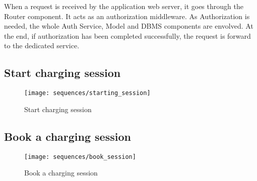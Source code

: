 When a request is received by the application web server, it goes through the Router component. It acts as an authorization middleware. 
As Authorization is needed, the whole Auth Service, Model and DBMS components are envolved.
At the end, if authorization has been completed successfully, the request is forward to the dedicated service.
	
	
\subsection{Start charging session}
\begin{figure}[h]
\texttt{[image: sequences/starting\_session]}
\caption{Start charging session}
\end{figure}
\clearpage
	
\subsection{Book a charging session}
\begin{figure}[h]
\texttt{[image: sequences/book\_session]}
\caption{Book a charging session}
\end{figure}
\clearpage
	


















